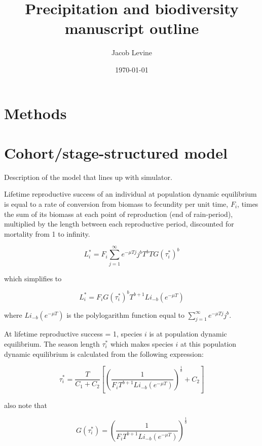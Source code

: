 \documentclass[11pt]{article}
\author{Jacob Levine}
\date{\today}
\title{Precipitation and biodiversity manuscript outline}
\begin{document}
\maketitle
\tableofcontents


\section{Methods}
\label{sec:orge095cac}


\section{Cohort/stage-structured model}
\label{sec:org7df8b36}

Description of the model that lines up with simulator.

Lifetime reproductive success of an individual at population dynamic equilibrium is equal to a rate of conversion from biomass to fecundity per unit time, \(F_i\), times the sum of its biomass at each point of reproduction (end of rain-period), multiplied by the length between each reproductive period, discounted for mortality from 1 to infinity.

\begin{equation}
    L_i^*  = F_i \sum_{j=1}^{\infty} e^{-\mu T j} j^b T^b T G(\tau_i^*)^b
\end{equation}

which simplifies to

\begin{equation}
    L_i^*  = F_i G(\tau_i^*)^b T^{b+1} Li_{-b}(e^{-\mu T })
\end{equation}

where \(Li_{-b}(e^{-\mu T })\) is the polylogarithm function equal to \(\sum_{j=1}^{\infty} e^{-\mu T j} j^b\).

At lifetime reproductive success = 1, species \(i\) is at population dynamic equilibrium. The season length \(\tau_i^*\) which makes species \(i\) at this population dynamic equilibrium is calculated from the following expression:

\begin{equation}
    \tau_i^* = \frac{T}{C_1 + C_2} \left[ \left( \frac{1}{F_i T^{b+1} Li_{-b}(e^{-\mu T})} \right)^{\frac{1}{b}} + C_2 \right]
\end{equation}

also note that

\begin{equation}
    G(\tau_i^*) = \left( \frac{1}{F_i T^{b+1} Li_{-b}(e^{-\mu T})} \right)^{\frac{1}{b}}
\end{equation}
\end{document}
